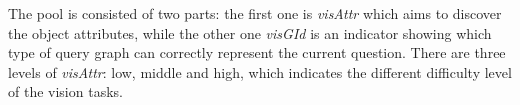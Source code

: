 The pool is consisted of two parts: the first one is \textit{visAttr} which aims to discover the object attributes, 
while the other one \textit{visGId} is an indicator showing which type of query graph can correctly represent the current question. %
There are three levels of \textit{visAttr}: low, middle and high, which indicates the different difficulty level of the vision tasks. 


